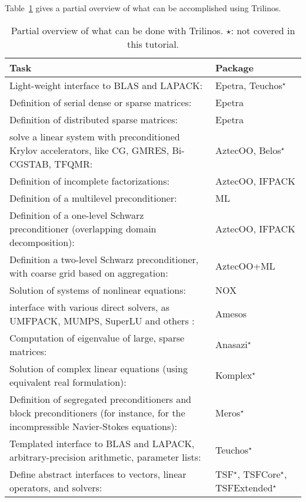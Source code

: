 Table~\ref{tab:tripackages} gives a partial overview of what can be
accomplished using Trilinos.
\begin{table}[htbp]
  \centering
  \begin{tabular}{| p{10cm} | p{3cm} |}
    \hline
    {\bf Task} & {\bf Package} \\
    \hline
    Light-weight interface to BLAS and LAPACK: & Epetra, Teuchos$^\star$ \\\hline
    Definition of serial dense or sparse matrices: & Epetra \\\hline
    Definition of distributed sparse matrices:& Epetra \\\hline
    solve a linear system with preconditioned Krylov accelerators, like
    CG, GMRES, Bi-CGSTAB, TFQMR:& AztecOO, Belos$^\star$ \\\hline
    Definition of incomplete factorizations:& AztecOO, \newline IFPACK \\\hline
    Definition of a multilevel preconditioner:& ML \\\hline
    Definition of a one-level Schwarz preconditioner (overlapping domain
    decomposition):& AztecOO, \newline IFPACK \\\hline
    Definition a two-level Schwarz preconditioner, with coarse grid based on
    aggregation:& AztecOO+ML \\\hline
    Solution of  systems of nonlinear equations:& NOX \\\hline
    interface with various direct solvers, as UMFPACK, MUMPS, SuperLU
    and others :& Amesos \\\hline
    Computation of eigenvalue of large, sparse matrices:& Anasazi$^\star$
    \\\hline
    Solution of complex linear equations (using equivalent real formulation):&
    Komplex$^\star$ \\\hline
    Definition of segregated preconditioners and block preconditioners (for
    instance, for the incompressible Navier-Stokes equations):&
    Meros$^\star$ \\\hline
    Templated interface to BLAS and LAPACK, arbitrary-precision
    arithmetic, parameter lists:& Teuchos$^\star$ \\\hline
    Define abstract interfaces to vectors, linear operators, and solvers:& TSF$^\star$, TSFCore$^\star$, TSFExtended$^\star$    \\
    \hline
  \end{tabular}
  \caption{Partial overview of what can be done with Trilinos. $\star$:
    not covered in this tutorial.}
  \label{tab:tripackages}
\end{table}


